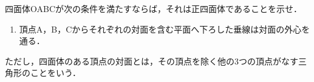 \documentclass[../../main.tex]{subfiles}
\begin{document}
四面体OABCが次の条件を満たすならば，それは正四面体であることを示せ．
\begin{enumerate}
  \item[条件：]頂点A，B，Cからそれぞれの対面を含む平面へ下ろした垂線は対面の外心を通る．
\end{enumerate}
ただし，四面体のある頂点の対面とは，その頂点を除く他の3つの頂点がなす三角形のことをいう．
\end{document}
